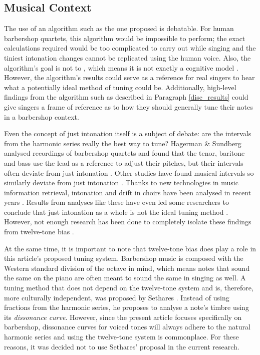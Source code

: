 \documentclass[a4paper]{article}
\begin{document}
\subsection{Musical Context}
\label{musical_context}
The use of an algorithm such as the one proposed is debatable. For human barbershop quartets, this algorithm would be impossible to perform; the exact calculations required would be too complicated to carry out while singing and the tiniest intonation changes cannot be replicated using the human voice. Also, the algorithm's goal is not to , which means it is not exactly a cognitive model \cite{van_maanen_interpretation_2021}. However, the algorithm's results could serve as a reference for real singers to hear what a potentially ideal method of tuning could be. Additionally, high-level findings from the algorithm such as described in Paragraph \ref{disc_results} could give singers a frame of reference as to how they should generally tune their notes in a barbershop context.

Even the concept of just intonation itself is a subject of debate: are the intervals from the harmonic series really the best way to tune? Hagerman \& Sundberg \cite{hagerman_fundamental_1980} analysed recordings of barbershop quartets and found that the tenor, baritone and bass use the lead as a reference to adjust their pitches, but their intervals often deviate from just intonation \cite{abbott_acoustic_2001}. Other studies have found musical intervals so similarly deviate from just intonation \cite{nordmark_intonation_1996, sundberg_rules_2009}. Thanks to new technologies in music information retrieval, intonation and drift in choirs have been analysed in recent years \cite{devaney_study_2012, mauch_intonation_2014, dai_intonation_2019}. Results from analyses like these have even led some researchers to conclude that just intonation as a whole is not the ideal tuning method \cite{parncutt_psychocultural_2018, kopiez_intonation_2003}. However, not enough research has been done to completely isolate these findings from twelve-tone bias \cite{burns_7_1999}.

At the same time, it is important to note that twelve-tone bias does play a role in this article's proposed tuning system. Barbershop music is composed with the Western standard division of the octave in mind, which means notes that sound the same on the piano are often meant to sound the same in singing as well. A tuning method that does not depend on the twelve-tone system and is, therefore, more culturally independent, was proposed by Sethares \cite{sethares_adaptive_1994}. Instead of using fractions from the harmonic series, he proposes to analyse a note's timbre using its \textit{dissonance curve}. However, since the present article focuses specifically on barbershop, dissonance curves for voiced tones will always adhere to the natural harmonic series \cite{duifhuis_measurement_1982} and using the twelve-tone system is commonplace. For these reasons, it was decided not to use Sethares' proposal in the current research.
\end{document}
